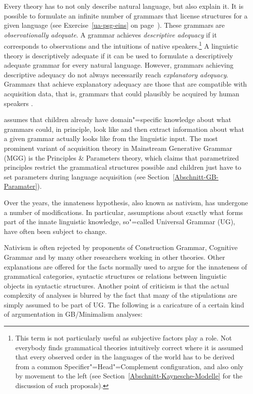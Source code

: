 Every theory has to not only describe natural language, but also explain it. It is possible to
formulate an infinite number of grammars that license structures for a given language (see Exercise~\ref{ua-psg-eins} on page~\pageref{ua-psg-eins}). These grammars are \emph{observationally adequate}.
A grammar achieves \emph{descriptive adequacy} if it corresponds to observations and the intuitions of native speakers.\footnote{
This term is not particularly useful as subjective factors play a role. Not everybody finds grammatical theories intuitively correct where it is assumed that every
observed order in the languages of the world has to be derived from a common
Specifier"=Head"=Complement configuration, and also only by movement to the left (see Section~\ref{Abschnitt-Kaynesche-Modelle} for the discussion of such proposals).
}
A linguistic theory is descriptively adequate if it can be used to formulate a descriptively adequate grammar for every natural language. However, grammars achieving descriptive
adequacy do not always necessarily reach \emph{explanatory adequacy}. Grammars that achieve explanatory adequacy are those that are compatible with
acquisition data, that is, grammars that could plausibly be acquired by human speakers \citep[--25]{Chomsky65a}.

\citet[]{Chomsky65a} assumes that children already have domain"=specific knowledge about what grammars could, in principle, look like and then extract information about what
a given grammar actually looks like from the linguistic input. The most prominent variant of acquisition theory in Mainstream Generative Grammar (MGG) is the Principles \& Parameters
theory, which claims that parametrized principles restrict the grammatical structures possible and
children just have to set parameters during language acquisition
(see Section~\ref{Abschnitt-GB-Paramater}).

Over the years, the innateness hypothesis, also known as nativism, has undergone a number of modifications.
In particular, assumptions about exactly what forms part of the innate linguistic knowledge,
so"=called Universal Grammar (UG), have often been subject to change.

Nativism is often rejected by proponents of Construction Grammar\indexcxg, Cognitive
Grammar and by many other researchers working in other theories. Other
explanations are offered for the facts normally used to argue for the innateness of grammatical
categories, syntactic structures or relations between linguistic objects in syntactic structures.
Another point of criticism is that the actual complexity of analyses is blurred by the fact that many of the stipulations are simply assumed to be part of UG.
The following is a caricature of a certain kind of argumentation in GB/Minimalism analyses: 

